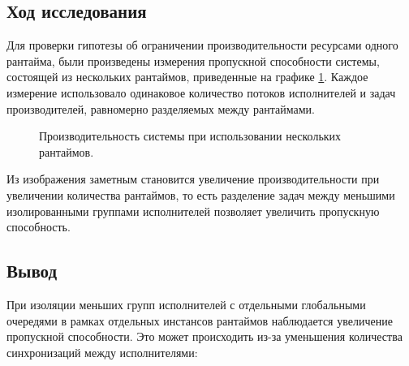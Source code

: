 \subsection{Ход исследования}

Для проверки гипотезы об ограничении производительности ресурсами одного рантайма, были произведены измерения пропускной способности системы, состоящей из нескольких рантаймов, приведенные на графике \ref{fig:tatlin:multi_rt:eval}. Каждое измерение использовало одинаковое количество потоков исполнителей и задач производителей, равномерно разделяемых между рантаймами.

\begin{figure}[H]
    \begin{center}
    \end{center}

    \caption{Производительность системы при использовании нескольких рантаймов.}
    \label{fig:tatlin:multi_rt:eval}
\end{figure}

Из изображения заметным становится увеличение производительности при увеличении количества рантаймов, то есть разделение задач между меньшими изолированными группами исполнителей позволяет увеличить пропускную способность.

\subsection{Вывод}

При изоляции меньших групп исполнителей с отдельными глобальными очередями в рамках отдельных инстансов рантаймов наблюдается увеличение пропускной способности. Это может происходить из-за уменьшения количества синхронизаций между исполнителями:

